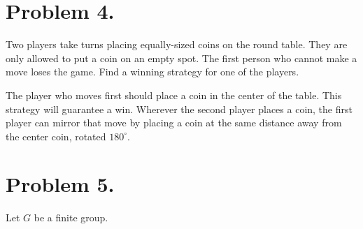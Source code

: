 \documentclass{article}
\begin{document}
\section{Problem 4.}
Two players take turns placing equally-sized coins on the round table. They are only allowed to put a coin on an empty spot. The first person who cannot make a move loses the game. Find a winning strategy for one of the players.
\par The player who moves first should place a coin in the center of the table. This strategy will guarantee a win. Wherever the second player places a coin, the first player can mirror that move by placing a coin at the same distance away from the center coin, rotated $180^{\circ}$.


\section{Problem 5.}
Let $G$ be a finite group.
\end{document}
